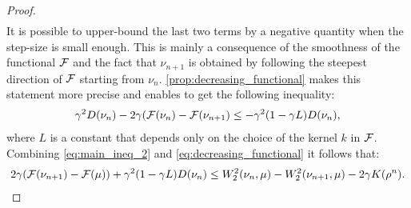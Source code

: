 \begin{proof}
\begin{align}
	\label{eq:main_ineq_2}
	\end{align}
	It is possible to upper-bound the last two terms by a negative quantity when the step-size is small enough. This is mainly a consequence of the smoothness of the functional ${{\mathcal F}}$ and the fact that $\nu_{n+1}$ is obtained by following the steepest direction of ${{\mathcal F}}$ starting from $\nu_n$. \cref{prop:decreasing_functional} makes this statement more precise and enables to get the following inequality:
	\begin{align}
	\gamma^2 D(\nu_n) -2\gamma ({{\mathcal F}}(\nu_n)-{{\mathcal F}}(\nu_{n+1})\leq -\gamma^2 (1-\gamma L)D(\nu_n),
	\label{eq:decreasing_functional}
	\end{align}
	where $L$ is a constant that depends only on the choice of the kernel $k$ in ${{\mathcal F}}$. Combining  \cref{eq:main_ineq_2} and \cref{eq:decreasing_functional} it follows that:
	\begin{align}
	2\gamma({{\mathcal F}}(\nu_{n+1})-{{\mathcal F}}(\mu))+\gamma^2(1-\gamma L)D(\nu_n)
	\leq 
	W_2^2(\nu_n,\mu)-W_2^2(\nu_{n+1},\mu)-2\gamma K(\rho^n).
	\label{eq:main_final}
	\end{align}
\end{proof}


